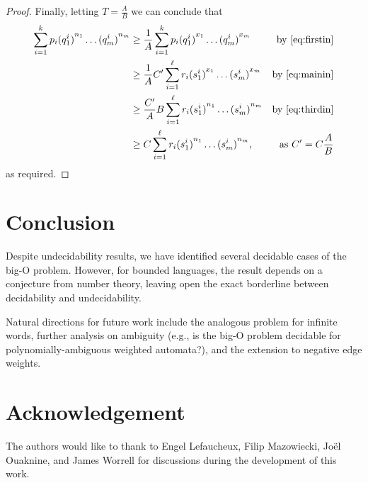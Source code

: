 \documentclass{lmcs}
\theoremstyle{plain}
\theoremstyle{definition}
\theoremstyle{remark}
\begin{document}
\begin{proof}
Finally, letting $T=\frac{A}{B}$ we can conclude that
\begin{align*}
 \sum_{i=1}^{k} p_i{({q}^i_1)}^{n_1}\dots {({q}^i_m)}^{n_m} &\ge
\frac{1}{A}\sum_{i=1}^{k} p_i{({q}^i_1)}^{x_1}\dots {({q}^i_m)}^{x_m}
&\text{by \cref{eq:firstin}}
\\ & \ge\frac{1}{A}  C'\sum_{i=1}^{\ell} r_i{({s}^i_1)}^{x_1}\dots {({s}^i_m)}^{x_m}
&\text{by \cref{eq:mainin}}
\\ & \ge  \frac{ C'}{A}B \sum_{i=1}^{\ell} r_i{({s}^i_1)}^{n_1}\dots {({s}^i_m)}^{n_m}&\text{by \cref{eq:thirdin}}
\\ & \ge C \sum_{i=1}^{\ell} r_i{({s}^i_1)}^{n_1}\dots {({s}^i_m)}^{n_m},&\text{as $C' = C\frac{A}{B}$}
\end{align*}
as required.
\end{proof}

\section{Conclusion}
Despite undecidability results, we have identified several decidable cases of the big-O problem.
However, for  bounded languages, the result depends on a conjecture from number theory, leaving open the exact borderline between decidability
and undecidability.

Natural directions for future work include the analogous problem for infinite words, further analysis on ambiguity (e.g., is the big-O problem decidable for polynomially-ambiguous weighted automata?), and the extension to negative edge weights.

\section*{Acknowledgement}

The authors would like to thank to Engel Lefaucheux, Filip Mazowiecki, Jo\"el Ouaknine, and James Worrell for discussions during the development of this work.

 


\end{document}
